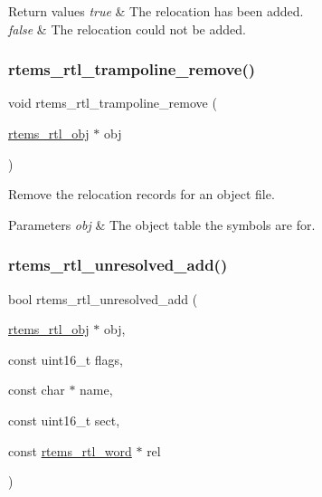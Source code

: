 \begin{DoxyRetVals}{Return values}
{\em true} & The relocation has been added. \\
\hline
{\em false} & The relocation could not be added. \\
\hline
\end{DoxyRetVals}
\mbox{\label{rtl-unresolved_8c_a962fc939ba38c1794ff7acdb15cdfa16}} 
\subsubsection{\texorpdfstring{rtems\_rtl\_trampoline\_remove()}{rtems\_rtl\_trampoline\_remove()}}
{\footnotesize\ttfamily void rtems\+\_\+rtl\+\_\+trampoline\+\_\+remove (\begin{DoxyParamCaption}\item[{\mbox{\hyperlink{structrtems__rtl__obj}{rtems\+\_\+rtl\+\_\+obj}} $\ast$}]{obj }\end{DoxyParamCaption})}

Remove the relocation records for an object file.


\begin{DoxyParams}{Parameters}
{\em obj} & The object table the symbols are for. \\
\hline
\end{DoxyParams}
\mbox{\label{rtl-unresolved_8c_ac44b141fa52eac7924e104379259eddf}} 
\subsubsection{\texorpdfstring{rtems\_rtl\_unresolved\_add()}{rtems\_rtl\_unresolved\_add()}}
{\footnotesize\ttfamily bool rtems\+\_\+rtl\+\_\+unresolved\+\_\+add (\begin{DoxyParamCaption}\item[{\mbox{\hyperlink{structrtems__rtl__obj}{rtems\+\_\+rtl\+\_\+obj}} $\ast$}]{obj,  }\item[{const uint16\+\_\+t}]{flags,  }\item[{const char $\ast$}]{name,  }\item[{const uint16\+\_\+t}]{sect,  }\item[{const \mbox{\hyperlink{rtl-unresolved_8h_a5ab1ca8c94e49686f84f5ccf0731f0e6}{rtems\+\_\+rtl\+\_\+word}} $\ast$}]{rel }\end{DoxyParamCaption})}

